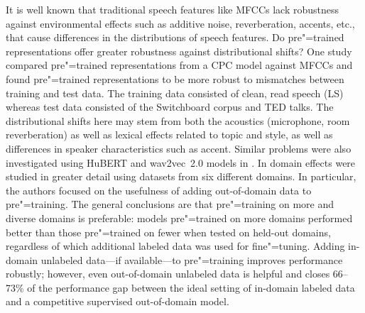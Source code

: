 It is well known that traditional speech features like MFCCs lack
robustness against environmental effects such as additive noise,
reverberation, accents, etc., that cause differences in the distributions of
speech features.
Do pre"=trained representations offer greater robustness against distributional
shifts? 
One study~\parencite{kawakami_learning_2020} compared pre"=trained
representations from a CPC model against MFCCs and 
found pre"=trained representations to be more robust to mismatches between
training and test data. The 
training data consisted of clean, read speech (LS)
whereas test data consisted of the Switchboard corpus and TED talks. The
distributional shifts here may stem from both the acoustics (microphone, room
reverberation) as well as
lexical effects related to topic and style, as well as differences in speaker
characteristics such as accent. 
Similar problems were also investigated using HuBERT and wav2vec~2.0 models in
\parencite{chang_exploration_2021}.
In \parencite{hsu_robust_2021} domain effects were studied in greater detail using 
datasets from six different domains. In particular, the authors focused on the
usefulness of adding out-of-domain data to pre"=training. The general
conclusions are that pre"=training on more and diverse domains is preferable:
models pre"=trained on more domains performed better than those pre"=trained on
fewer when tested on held-out domains, regardless of which additional
labeled data was used for fine"=tuning. Adding in-domain unlabeled data---if
available---to pre"=training improves performance robustly; however, even
out-of-domain unlabeled data is helpful and closes  66--73\% of the performance
gap between the ideal setting of in-domain labeled data and a competitive
supervised out-of-domain model. 
 
